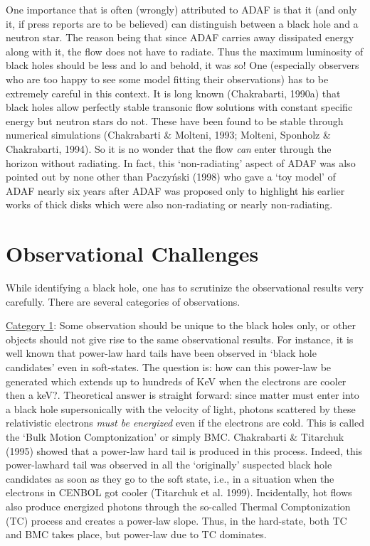 \documentclass{ws-procs975x65}
\begin{document}
One importance that is often (wrongly) attributed to ADAF is that it 
(and only it, if press reports are to be believed) can distinguish 
between a black hole and a neutron star. The reason being that since
ADAF carries away dissipated energy along with it, the flow does not 
have to radiate. Thus the maximum luminosity of black holes should be 
less and lo and behold, it was so! One  (especially observers who are 
too happy to see some model fitting their observations) has to be 
extremely careful in this context. It is long known (Chakrabarti, 1990a) 
that black holes allow perfectly stable transonic flow solutions 
with constant specific energy but neutron stars do not. These have been 
found to be stable through numerical simulations (Chakrabarti \& Molteni,
1993; Molteni, Sponholz \& Chakrabarti, 1994). So it is no wonder that
the flow {\it can} enter through the horizon without radiating. In fact, 
this `non-radiating' aspect of ADAF was also pointed out by none other 
than Paczy\'nski (1998) who gave a `toy model' of ADAF nearly six years 
after ADAF was proposed only to highlight his earlier works of thick 
disks which were also non-radiating or nearly non-radiating. 

\section{Observational Challenges}

While identifying a black hole, one has to scrutinize the observational
results very carefully. There are several categories of observations. 

\noindent \underline{Category 1}: Some observation should be unique to the black 
holes only, or other objects should not give rise to the same observational 
results. For instance, it is well known that power-law hard tails have been
observed  in `black hole candidates' even in soft-states. The question 
is: how can this power-law be generated which extends up to hundreds of 
KeV when the electrons are cooler then a keV?. Theoretical answer is 
straight forward: since matter must enter into a black hole 
supersonically with the velocity of light, photons scattered by 
these relativistic electrons {\it must be energized} even if the 
electrons are cold.  This is called the `Bulk Motion Comptonization' 
or simply BMC. Chakrabarti \& Titarchuk (1995) showed that a power-law 
hard tail is produced in this process. Indeed, this power-lawhard tail was observed in
all the `originally' suspected black hole candidates as soon as they 
go to the soft state, i.e., in a situation when the electrons in 
CENBOL got cooler (Titarchuk et al. 1999). Incidentally, hot flows 
also produce energized photons through the so-called Thermal 
Comptonization (TC) process and creates a power-law slope. Thus, in 
the hard-state, both TC and BMC takes place, but power-law due to TC dominates. 
\end{document}
